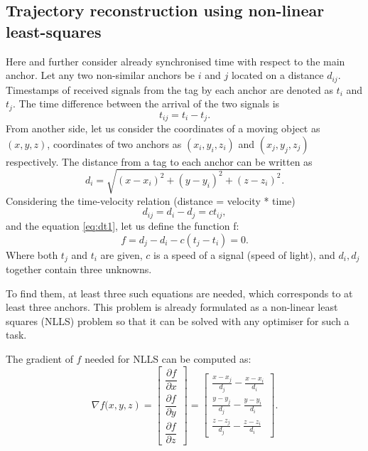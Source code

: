 \documentclass[journal]{IEEEtran}
\begin{document}
\subsection{Trajectory reconstruction using non-linear least-squares}
\label{sec:solution_nlsq}
Here and further consider already synchronised time with respect to the main anchor.
Let any two non-similar anchors be $i$ and $j$ located on a distance $d_{ij}$.
Timestamps of received signals from the tag by each anchor are denoted as $t_i$ and $t_j$.
The time difference between the arrival of the two signals is
\begin{equation}
    {t}_{ij} = t_i - t_j.
    \label{eq:dt1}
\end{equation}
From another side, let us consider the coordinates of a moving object as $(x, y, z)$, coordinates of two anchors as $(x_i, y_i, z_i)$ and $(x_j, y_j, z_j)$ respectively.
The distance from a tag to each anchor can be written as
\begin{equation}
    d_i = \sqrt{(x-x_i)^2 + (y-y_i)^2 + (z - z_i)^2}.
    \label{eq:dist}
\end{equation}
Considering the time-velocity relation (distance = velocity * time) 
\begin{equation}
    \label{eq:ddcdt}
    {d}_{ij} = d_i - d_j = c{t}_{ij},
\end{equation}
and the equation \eqref{eq:dt1}, let us define the function f:
\begin{equation}
    \label{eq:f}
    f = d_j - d_i - c (t_j - t_i) = 0.
\end{equation}
Where both $t_j$ and $t_i$ are given, $c$ is a speed of a signal (speed of light), and $d_i, d_j$ together contain three unknowns. 

To find them, at least three such equations are needed, which corresponds to at least three anchors.
This problem is already formulated as a non-linear least squares (NLLS) problem so that it can be solved with any optimiser for such a task.

The gradient of $f$ needed for NLLS can be computed as:
\begin{equation}
    \nabla f(\left.x, y, z\right)=\left[\begin{array}{c}
    \dfrac{\partial f}{\partial x}\\
    \dfrac{\partial f}{\partial y}\\
    \dfrac{\partial f}{\partial z}
\end{array}\right] = \left[\begin{array}{c}
    \frac{x-x_j}{d_j} - \frac{x-x_i}{d_i}\\
    \frac{y-y_j}{d_j} - \frac{y-y_i}{d_i}\\
    \frac{z-z_j}{d_j} - \frac{z-z_i}{d_i}
    \end{array}\right].
\end{equation}
\end{document}
